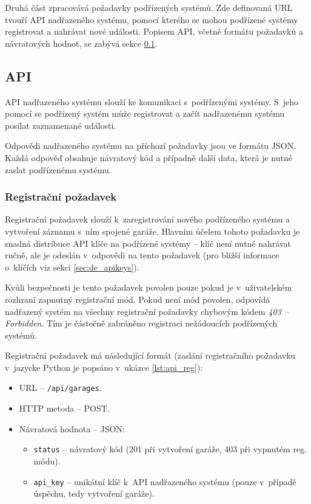 Druhá část zpracovává požadavky podřízených systémů. Zde definovaná URL tvouří API nadřazeného systému, pomocí kterého se mohou podřízené systémy registrovat a nahrávat nové události. Popisem API, včetně formátu požadavků a návratových hodnot, se zabývá sekce \ref{sec:de_api}.

\subsection{API}
\label{sec:de_api}


API nadřazeného systému slouží ke komunikaci s~podřízenými systémy. S~jeho pomocí se podřízený systém může registrovat a začít nadřazenému systému posílat zaznamenané události.

Odpovědi nadřazeného systému na příchozí požadavky jsou ve formátu JSON. Každá odpověď obsahuje návratový kód a případně další data, která je nutné zaslat podřízenému systému.

\subsubsection{Registrační požadavek}

Registrační požadavek slouží k~zaregistrování nového podřízeného systému a vytvoření záznamu s~ním spojené garáže. Hlavním účelem tohoto požadavku je snadná distribuce API klíče na podřízené systémy -- klíč není nutné nahrávat ručně, ale je odeslán v~odpovědi na tento požadavek (pro bližší informace o~klíčích viz sekci \ref{sec:de_apikeys}).

Kvůli bezpečnosti je tento požadavek povolen pouze pokud je v~uživatelském rozhraní zapnutný registrační mód. Pokud není mód povolen, odpovídá nadřazený systém na všechny registrační požadavky chybovým kódem \textit{403 -- Forbidden}. Tím je částečně zabráněno registraci nežádoucích podřízených systémů.

Registrační požadavek má následující formát (zaslání registračního požadavku v~jazycke Python je popsáno v~ukázce \ref{lst:api_reg}):

\begin{itemize}
    \item URL -- \texttt{/api/garages}.
    \item HTTP metoda -- POST.
    \item Návratová hodnota -- JSON:
    \begin{itemize}
        \item \texttt{status} -- návratový kód (201 při vytvoření garáže, 403 při vypnutém reg. módu).
        \item \texttt{api\_key} -- unikátní klíč k~API nadřazeného systému (pouze v~případě úspěchu, tedy vytvoření garáže).
    \end{itemize}
\end{itemize}

